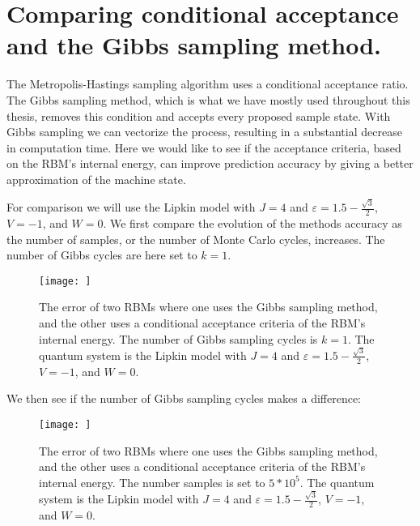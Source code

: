 \section{Comparing conditional acceptance and the Gibbs sampling method.}

The Metropolis-Hastings sampling algorithm uses a conditional acceptance ratio. The Gibbs sampling method, which is what we have mostly used throughout this thesis, removes this condition and accepts every proposed sample state. With Gibbs sampling we can vectorize the process, resulting in a substantial decrease in computation time. Here we would like to see if the acceptance criteria, based on the RBM's internal energy, can improve prediction accuracy by giving a better approximation of the machine state. 

\vspace{\baselineskip}

\def \mgJ {4}
\def \mgeps {1.5 - \frac{\sqrt{3}}{2}}
\def \mgV {-1}
\def \mgW {0}
\def \mgk {1}
\def \mgC {5*10^5}

For comparison we will use the Lipkin model with $J= \mgJ$ and $\varepsilon = \mgeps$, $V= \mgV$, and $W = \mgW$. We first compare the evolution of the methods accuracy as the number of samples, or the number of Monte Carlo cycles, increases. The number of Gibbs cycles are here set to $k = \mgk$.

\begin{figure}[H]
  \begin{center}
    \texttt{[image: ]}
  \end{center}
  \caption{The error of two RBMs where one uses the Gibbs sampling method, and the other uses a conditional acceptance criteria of the RBM's internal energy. The number of Gibbs sampling cycles is $k = \mgk$. The quantum system is the Lipkin model with $J= \mgJ$ and $\varepsilon = \mgeps$, $V= \mgV$, and $W = \mgW$.}\label{fig:met_hast_1}
\end{figure}

We then see if the number of Gibbs sampling cycles makes a difference:

\begin{figure}[H]
  \begin{center}
    \texttt{[image: ]}
  \end{center}
  \caption{The error of two RBMs where one uses the Gibbs sampling method, and the other uses a conditional acceptance criteria of the RBM's internal energy. The number samples is set to $\mgC$. The quantum system is the Lipkin model with $J= \mgJ$ and $\varepsilon = \mgeps$, $V= \mgV$, and $W = \mgW$.}\label{fig:met_hast_2}
\end{figure}





